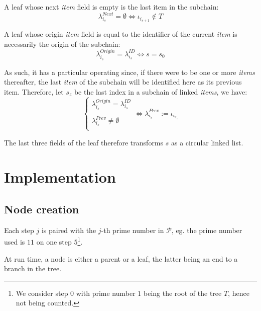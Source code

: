 \documentclass[twoside,twocolumn]{article}
\theoremstyle{definition}
\theoremstyle{remark}
\begin{document}
A leaf whose next \emph{item} field is empty is the last item in the subchain:
\begin{equation}
    \label{eq:lastItem}
    \lambda_{i_s}^{Next} = \emptyset \iff \iota_{i_{s+1}} \not\in T
\end{equation}

A leaf whose origin \emph{item} field is equal to the identifier of the current \emph{item} is necessarily the origin of the subchain:
\begin{equation}
    \label{eq:firstItem}
    \lambda_{i_s}^{Origin} = \lambda_{i_s}^{ID} \iff s = s_0
\end{equation}

As such, it has a particular operating since, if there were to be one or more \emph{items} thereafter, the last \emph{item} of the subchain will be 
identified here as its previous item. Therefore, let $s_z$ be the last index in a subchain of linked \emph{items}, we have:
\begin{equation}
    \label{eq:circularAtOrigin}
    \left\{
        \begin{array}{l}
            \lambda_{i_s}^{Origin} = \lambda_{i_s}^{ID} \\ \\
            \lambda_{i_s}^{Prev} \neq \emptyset \\
        \end{array}
    \right.
    \iff \lambda_{i_s}^{Prev} := \iota_{i_{s_z}}
\end{equation}

The last three fields of the leaf therefore transforms $s$ as a circular linked list.


\section{Implementation}

\subsection{Node creation}

Each step $j$ is paired with the $j$-th prime number in $\mathcal{P}$, eg. the prime number used is $11$ on one step $5$\footnote{We consider step 
$0$ with prime number $1$ being the root of the tree $T$, hence not being counted.}.

At run time, a node is either a parent or a leaf, the latter being an end to a branch in the tree.
\end{document}
